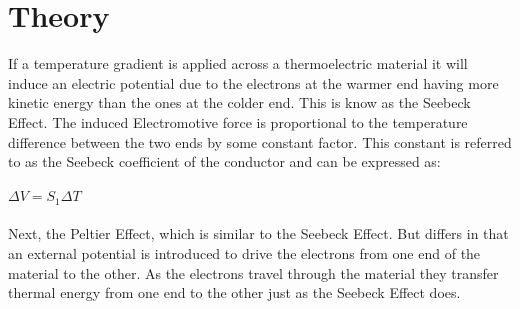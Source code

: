 \documentclass{article}
\begin{document}
\section{Theory}
If a temperature gradient is applied across a thermoelectric material it will induce an electric potential due to the electrons at the warmer end having more kinetic energy than the ones at the colder end. This is know as the Seebeck Effect. The induced Electromotive force is proportional to the temperature difference between the two ends by some constant factor. This constant is referred to as the Seebeck coefficient of the conductor and can be expressed as:\\\\
$\Delta V=S_1\Delta T$\\\\
Next, the Peltier Effect, which is similar to the Seebeck Effect. But differs in that an external potential is introduced to drive the electrons from one end of the material to the other. As the electrons travel through the material they transfer thermal energy from one end to the other just as the Seebeck Effect does.\\ 
\end{document}
